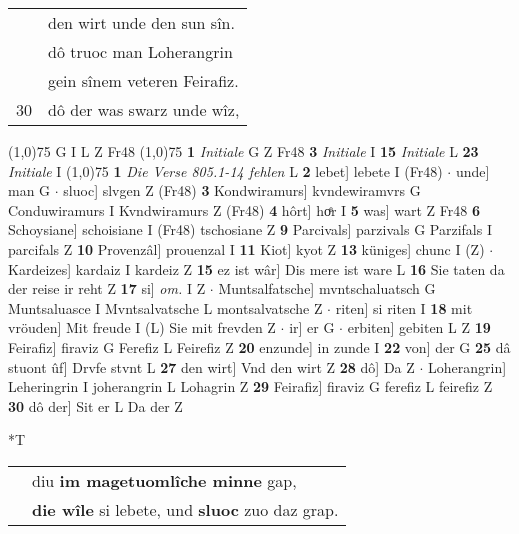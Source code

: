 \documentclass[8pt,a4paper,notitlepage]{article}
\begin{document}
\begin{table}[ht]
\begin{minipage}[t]{0.5\linewidth}
\begin{tabular}{rl}
 & den wirt unde den sun sîn.\\ 
 & dô truoc man Loherangrin\\ 
 & gein sînem veteren Feirafiz.\\ 
30 & dô der was swarz unde wîz,\\ 
\end{tabular}
\scriptsize
\line(1,0){75} \newline
G I L Z Fr48 \newline
\line(1,0){75} \newline
\textbf{1} \textit{Initiale} G Z Fr48  \textbf{3} \textit{Initiale} I  \textbf{15} \textit{Initiale} L  \textbf{23} \textit{Initiale} I  \newline
\line(1,0){75} \newline
\textbf{1} \textit{Die Verse 805.1-14 fehlen} L  \textbf{2} lebet] lebete I (Fr48)  $\cdot$ unde] man G  $\cdot$ sluoc] slvgen Z (Fr48) \textbf{3} Kondwiramurs] kvndewiramvrs G Conduwiramurs I Kvndwiramurs Z (Fr48) \textbf{4} hôrt] hoͤr I \textbf{5} was] wart Z Fr48 \textbf{6} Schoysiane] schoisiane I (Fr48) tschosiane Z \textbf{9} Parcivals] parzivals G Parzifals I parcifals Z \textbf{10} Provenzâl] prouenzal I \textbf{11} Kiot] kyot Z \textbf{13} küniges] chunc I (Z)  $\cdot$ Kardeizes] kardaiz I kardeiz Z \textbf{15} ez ist wâr] Dis mere ist ware L \textbf{16} Sie taten da der reise ir reht Z \textbf{17} si] \textit{om.} I Z  $\cdot$ Muntsalfatsche] mvntschaluatsch G Muntsaluasce I Mvntsalvatsche L montsalvatsche Z  $\cdot$ riten] si riten I \textbf{18} mit vröuden] Mit freude I (L) Sie mit frevden Z  $\cdot$ ir] er G  $\cdot$ erbiten] gebiten L Z \textbf{19} Feirafiz] firaviz G Ferefiz L Feirefiz Z \textbf{20} enzunde] in zunde I \textbf{22} von] der G \textbf{25} dâ stuont ûf] Drvfe stvnt L \textbf{27} den wirt] Vnd den wirt Z \textbf{28} dô] Da Z  $\cdot$ Loherangrin] Leheringrin I joherangrin L Lohagrin Z \textbf{29} Feirafiz] firaviz G ferefiz L feirefiz Z \textbf{30} dô der] Sit er L Da der Z \newline
\end{minipage}
\hspace{0.5cm}
\begin{minipage}[t]{0.5\linewidth}
\small
\begin{center}*T
\end{center}
\begin{tabular}{rl}
 & diu \textbf{im magetuomlîche minne} gap,\\ 
 & \textbf{die wîle} si lebete, und \textbf{sluoc} zuo daz grap.\\ 

\end{tabular}
\end{minipage}
\end{table}
\end{document}

